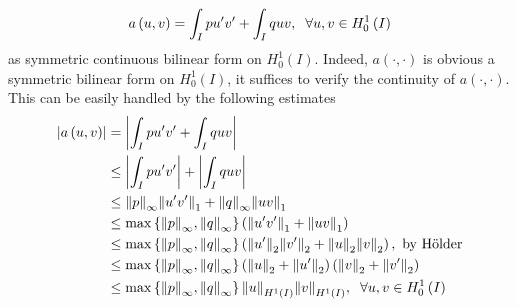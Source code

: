 \documentclass[a4paper,oneside]{article}
\numberwithin{equation}{section}
\begin{document}
\begin{align}
a\left( {u,v} \right) = \int_I {pu'v'}  + \int_I {quv} ,\hspace{0.2cm}\forall u,v \in H_0^1\left( I \right)
\end{align}
as symmetric continuous bilinear form on $H_0^1\left(I\right)$. Indeed, $a\left(\cdot,\cdot\right)$ is obvious a symmetric bilinear form on $H_0^1\left(I\right)$, it suffices to verify the continuity of $a\left(\cdot,\cdot\right)$. This can be easily handled by the following estimates
\begin{align}
\left| {a\left( {u,v} \right)} \right| &= \left| {\int_I {pu'v'}  + \int_I {quv} } \right|\\
& \le \left| {\int_I {pu'v'} } \right| + \left| {\int_I {quv} } \right|\\
& \le {\left\| p \right\|_\infty }{\left\| {u'v'} \right\|_1} + {\left\| q \right\|_\infty }{\left\| {uv} \right\|_1}\\
& \le \max \left\{ {{{\left\| p \right\|}_\infty },{{\left\| q \right\|}_\infty }} \right\}\left( {{{\left\| {u'v'} \right\|}_1} + {{\left\| {uv} \right\|}_1}} \right)\\
& \le \max \left\{ {{{\left\| p \right\|}_\infty },{{\left\| q \right\|}_\infty }} \right\}\left( {{{\left\| {u'} \right\|}_2}{{\left\| {v'} \right\|}_2} + {{\left\| u \right\|}_2}{{\left\| v \right\|}_2}} \right),\mbox{ by H\"{o}lder}\\
& \le \max \left\{ {{{\left\| p \right\|}_\infty },{{\left\| q \right\|}_\infty }} \right\}\left( {{{\left\| u \right\|}_2} + {{\left\| {u'} \right\|}_2}} \right)\left( {{{\left\| v \right\|}_2} + {{\left\| {v'} \right\|}_2}} \right)\\
& \le \max \left\{ {{{\left\| p \right\|}_\infty },{{\left\| q \right\|}_\infty }} \right\}{\left\| u \right\|_{{H^1}\left( I \right)}}{\left\| v \right\|_{{H^1}\left( I \right)}},\hspace{0.2cm}\forall u,v \in H_0^1\left( I \right)
\end{align}
\end{document}

